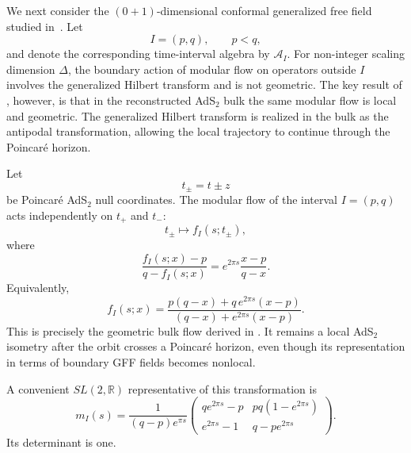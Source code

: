 \documentclass[a4paper,11pt]{article}
\theoremstyle{definition}
\begin{document}
We next consider the $(0+1)$-dimensional conformal generalized free field
studied in~\cite{LashkariLeungMoosaOuseph2025}. Let
\begin{equation}
    I=(p,q),
    \qquad
    p<q,
\end{equation}
and denote the corresponding time-interval algebra by $\mathcal A_I$.
For non-integer scaling dimension $\Delta$, the boundary action of
modular flow on operators outside $I$ involves the generalized Hilbert
transform and is not geometric. The key result of
\cite{LashkariLeungMoosaOuseph2025}, however, is that in the reconstructed
AdS$_2$ bulk the same modular flow is local and geometric. The generalized
Hilbert transform is realized in the bulk as the antipodal
transformation, allowing the local trajectory to continue through the
Poincar\'e horizon.

Let
\begin{equation}
    t_\pm=t\pm z
\end{equation}
be Poincar\'e AdS$_2$ null coordinates. The modular flow of the interval
$I=(p,q)$ acts independently on $t_+$ and $t_-$:
\begin{equation}
    t_\pm
    \longmapsto
    f_I(s;t_\pm),
    \label{eq:GFF-bulk-modular-flow}
\end{equation}
where
\begin{equation}
    \frac{
        f_I(s;x)-p
    }{
        q-f_I(s;x)
    }
    =
    e^{2\pi s}
    \frac{x-p}{q-x}.
    \label{eq:GFF-uniformizing-flow}
\end{equation}
Equivalently,
\begin{equation}
    f_I(s;x)
    =
    \frac{
        p(q-x)+q\,e^{2\pi s}(x-p)
    }{
        (q-x)+e^{2\pi s}(x-p)
    }.
    \label{eq:GFF-fI}
\end{equation}
This is precisely the geometric bulk flow derived in
\cite{LashkariLeungMoosaOuseph2025}. It remains a local AdS$_2$
isometry after the orbit crosses a Poincar\'e horizon, even though its
representation in terms of boundary GFF fields becomes nonlocal.

A convenient $SL(2,\mathbb R)$ representative of this transformation is
\begin{equation}
    m_I(s)
    =
    \frac{1}{(q-p)e^{\pi s}}
    \begin{pmatrix}
        q e^{2\pi s}-p
        &
        pq(1-e^{2\pi s})
        \\[2mm]
        e^{2\pi s}-1
        &
        q-p e^{2\pi s}
    \end{pmatrix}.
    \label{eq:GFF-interval-matrix}
\end{equation}
Its determinant is one.
\end{document}
